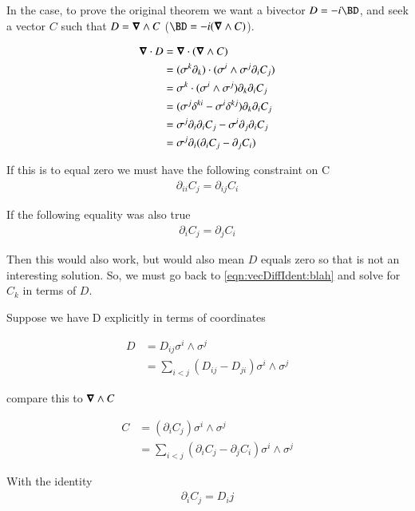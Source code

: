 In the  case, to prove the original theorem we want a bivector $D = -i\BD$, and seek a vector $C$ such that 
$D = \boldsymbol{\nabla} \wedge C$ ($\BD = -i (\spacegrad \wedge C)$).

\begin{align*}
\boldsymbol{\nabla} \cdot D 
&= \boldsymbol{\nabla} \cdot (\boldsymbol{\nabla} \wedge C) \\
&= (\sigma^k \partial_k) \cdot (\sigma^i \wedge \sigma^j \partial_i C_j) \\
&= \sigma^k \cdot (\sigma^i \wedge \sigma^j) \partial_k \partial_i C_j \\
&= ( \sigma^j \delta^{ki} - \sigma^i \delta^{kj} ) \partial_k \partial_i C_j \\
&= \sigma^j \partial_i \partial_i C_j - \sigma^i \partial_j \partial_i C_j \\
&= \sigma^j \partial_i (\partial_i C_j -\partial_j C_i) \\
\end{align*}

If this is to equal zero we must have the following constraint on C
\begin{align}\label{eqn:vecDiffIdent:blah}
\partial_{ii} C_j = \partial_{ij} C_i
\end{align}

If the following equality was also true
\begin{align*}
\partial_{i} C_j = \partial_j C_i
\end{align*}

Then this would also work, but would also mean $D$ equals zero so that is not an interesting solution.  So, we must go back to
\ref{eqn:vecDiffIdent:blah} and solve for $C_k$ in terms of $D$.

Suppose we have D explicitly in terms of coordinates

\begin{align*}
D 
&= D_{ij} \sigma^i \wedge \sigma^j \\
&= \sum_{i<j} (D_{ij} -D_{ji})\sigma^i \wedge \sigma^j
\end{align*}

compare this to $\boldsymbol{\nabla} \wedge C$

\begin{align*}
C &= (\partial_i C_j ) \sigma^i \wedge \sigma^j \\
  &= \sum_{i<j} (\partial_i C_j -\partial_j C_i) \sigma^i \wedge \sigma^j
\end{align*}

With the identity
\begin{align*}
\partial_i C_j = D_ij
\end{align*}

